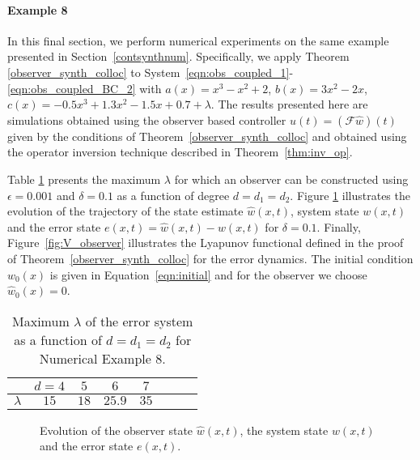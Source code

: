 \documentclass[9pt,journal,twocolumn]{IEEEtran}
\newcommand{\wh}{\hat{w}}
\begin{document}
\paragraph{Example 8} In this final section, we perform numerical experiments on the same example presented in Section~\ref{contsynthnum}. Specifically, we apply Theorem \ref{observer_synth_colloc} to System~\eqref{eqn:obs_coupled_1}-\eqref{eqn:obs_coupled_BC_2} with $a(x)=x^3-x^2+2$, $b(x)=3x^2-2x$, $c(x)= -0.5x^3 + 1.3x^2 - 1.5x + 0.7+\lambda$. The results presented here are simulations obtained using the observer based controller $u(t)=(\mathcal{F}\wh)(t)$ given by the conditions of Theorem~\ref{observer_synth_colloc} and obtained using the operator inversion technique described in Theorem~\ref{thm:inv_op}.

Table \ref{table_obs_2} presents the maximum  $\lambda$ for which an observer can be constructed using $\epsilon=0.001$ and $\delta=0.1$ as a function of degree $d=d_1=d_2$. Figure \ref{fig:obs} illustrates the evolution of the trajectory of the state estimate $\wh(x,t)$, system state $w(x,t)$ and the error state $e(x,t)=\wh(x,t)-w(x,t)$ for $\delta=0.1$. Finally, Figure~\ref{fig:V_observer} illustrates the Lyapunov functional defined in the proof of Theorem~\ref{observer_synth_colloc} for the error dynamics. The initial condition $w_0(x)$ is given in Equation~\eqref{eqn:initial} and for the observer we choose $\wh_0(x)=0$.


\begin{table}[h!]
\begin{center}
    \begin{tabular}{l *{7}{c}}\hline \hline
  & $d=4$ & $5$ & $6$ & $7$ \\ \hline
$\lambda$ &  $15$ & $18$ & $25.9$ & $35$ \\
\end{tabular}
\end{center}
\caption{Maximum $\lambda$ of the error system as a function of $d=d_1=d_2$ for Numerical Example 8.}
\label{table_obs_2}
\end{table}



\begin{figure}[ht]
\centering
{}
\quad
{}
\quad
{}
\caption{Evolution of the observer state $\wh(x,t)$, the system state $w(x,t)$ and the error state $e(x,t)$.}
\label{fig:obs}
\end{figure}
\end{document}
